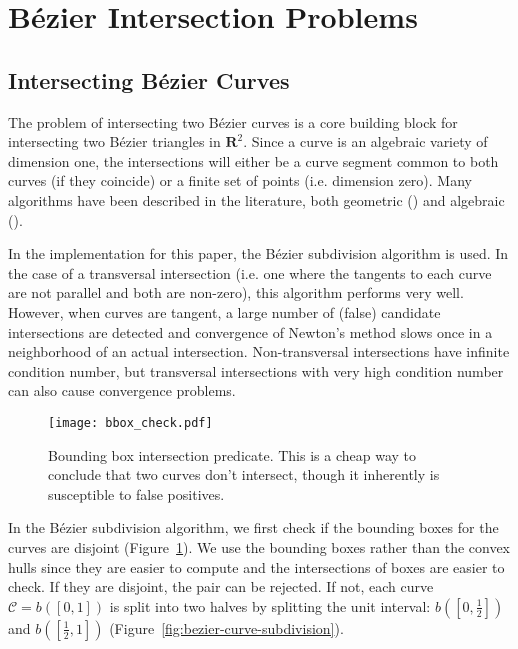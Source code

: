 \documentclass[letterpaper,10pt]{article}
\theoremstyle{definition}
\newcommand{\reals}{\mathbf{R}}
\begin{document}



\appendix

\section{B\'{e}zier Intersection Problems}\label{sec:bezier-intersection}

\subsection{Intersecting B\'{e}zier Curves}

The problem of intersecting two B\'{e}zier curves is a core building
block for intersecting two B\'{e}zier triangles in \(\reals^2\).
Since a curve is an algebraic variety of dimension one,
the intersections will either be a curve segment common to both curves (if
they coincide) or a finite set of points (i.e. dimension zero).
Many algorithms have been described in the literature, both
geometric (\cite{Sederberg1986, Sederberg1990, Kim1998}) and
algebraic (\cite{Manocha:CSD-92-698}).

In the implementation for this paper, the B\'{e}zier subdivision
algorithm is used.
In the case of a transversal intersection (i.e. one where the
tangents to each curve are not parallel and both are non-zero),
this algorithm performs very well. However, when curves are tangent,
a large number of (false) candidate intersections are detected and
convergence of Newton's method slows once in a neighborhood of an
actual intersection. Non-transversal intersections
have infinite condition number, but transversal intersections with
very high condition number can also cause convergence problems.

\begin{figure}
  \texttt{[image: bbox\_check.pdf]}
  \centering
  \captionsetup{width=.75\linewidth}
  \caption{Bounding box intersection predicate. This is a cheap way to
    conclude that two curves don't intersect, though it inherently is
    susceptible to false positives.}
  \label{fig:bounding-box-check}
\end{figure}

In the B\'{e}zier subdivision algorithm, we first check if the
bounding boxes for the curves are disjoint
(Figure~\ref{fig:bounding-box-check}).
We use the bounding boxes
rather than the convex hulls since they are easier to compute and
the intersections of boxes are easier to check.
If they are disjoint, the pair can be rejected. If not, each curve
\(\mathcal{C} = b\left(\left[0, 1\right]\right)\) is split into two halves
by splitting the unit interval: \(b\left(\left[0, \frac{1}{2}\right]\right)\)
and \(b\left(\left[\frac{1}{2}, 1\right]\right)\)
(Figure~\ref{fig:bezier-curve-subdivision}).
\end{document}
